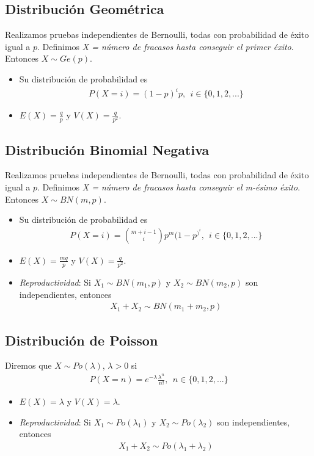 \subsection{Distribución Geométrica}
Realizamos pruebas independientes de Bernoulli, todas con probabilidad de éxito igual a $p$. Definimos \textit{X = número de fracasos hasta conseguir el primer éxito}. Entonces $X \sim Ge(p)$.
\begin{itemize}
    \item Su distribución de probabilidad es
    \begin{align*}
    P(X = i) = (1-p)^i p, \ \ i \in \{0,1,2,...\}
\end{align*}
    \item $E(X) = \frac{q}{p}$ y $V(X) = \frac{q}{p^2}$.
\end{itemize}

\subsection{Distribución Binomial Negativa}
Realizamos pruebas independientes de Bernoulli, todas con probabilidad de éxito igual a $p$. Definimos \textit{X = número de fracasos hasta conseguir el m-ésimo éxito}. Entonces $X \sim BN(m,p)$.
\begin{itemize}
    \item Su distribución de probabilidad es
    \begin{align*}
    P(X = i) = \binom{m+i-1}{i}p^m(1-p^)^i, \ \ i \in \{0,1,2,...\}
\end{align*}
    \item $E(X) = \frac{mq}{p}$ y $V(X) = \frac{q}{p^2}$.
    \item \textit{Reproductividad}: Si $X_1 \sim BN(m_1,p)$ y $X_2 \sim BN(m_2,p)$ son independientes, entonces
    \begin{align*}
        X_1 + X_2 \sim BN(m_1 + m_2,p)
    \end{align*}
\end{itemize}

\subsection{Distribución de Poisson}
Diremos que $X \sim Po(\lambda)$, $\lambda > 0$ si 
\begin{align*}
    P(X = n) = e^{-\lambda}\frac{\lambda^n}{n!}, \ \ n \in \{0,1,2,...\}
\end{align*}
\begin{itemize}
    \item $E(X) = \lambda$ y $V(X) = \lambda$.
    \item \textit{Reproductividad}: Si $X_1 \sim Po(\lambda_1)$ y $X_2 \sim Po(\lambda_2)$ son independientes, entonces
    \begin{align*}
        X_1 + X_2 \sim Po(\lambda_1 + \lambda_2)
    \end{align*}
\end{itemize}

